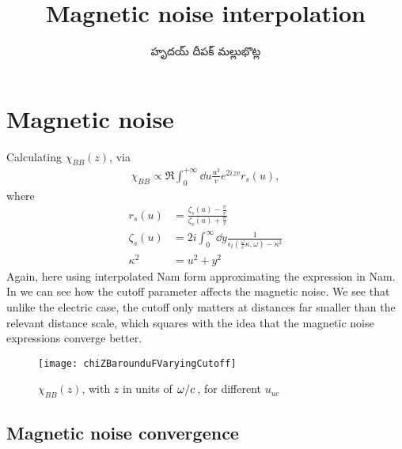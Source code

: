 \documentclass[../main.tex]{subfiles}
\title{Magnetic noise interpolation}
\author{\begin{telugu}హృదయ్ దీపక్ మల్లుభొట్ల\end{telugu}}
\date{}
\begin{document}
	\graphicspath{{\main/figures/}}

	\onlyinsubfile{\maketitle}

	\section{Magnetic noise} \label{sec:imnintro}

	Calculating $\chi_{BB}(z)$, via
	\begin{align}
		\chi_{BB} \propto \Re \int_0^{+\infty} \dd{u} \frac{u^3}{v} e^{2 i z v} r_s(u),
	\end{align}
	where
	\begin{align}
		r_s(u) &= \frac{\zeta_s(u) - \frac{\pi}{v}}{\zeta_s(u) + \frac{\pi}{v}} \\
		\zeta_s(u) &= 2i \int_0^\infty \dd{y} \frac{1}{\epsilon_t(\frac{\omega}{c}\kappa, \omega) - \kappa^2} \\
		\kappa^2 &= u^2 + y^2
	\end{align}
	Again, here using interpolated Nam form approximating the expression in Nam\supercite{Nam1967}.
	In  we can see how the cutoff parameter affects the magnetic noise.
	We see that unlike the electric case, the cutoff only matters at distances far smaller than the relevant distance scale, which squares with the idea that the magnetic noise expressions converge better.
	\begin{figure}[htp]
		\centering
		\texttt{[image: chiZBarounduFVaryingCutoff]}
		\caption{$\chi_{BB}(z)$, with $z$ in units of $\flatfrac{\omega}{c}$, for different $u_{uc}$} \label{fig:cutoff}
	\end{figure}

	\subsection{Magnetic noise convergence} \label{subsec:magneticnoiseconvergence}
\end{document}
